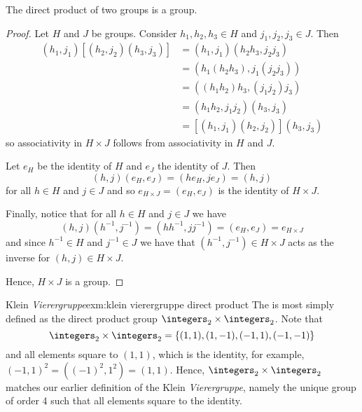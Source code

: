 \begin{thm}{}{}
    The direct product of two groups is a group.
    
    \begin{proof}
        Let \(H\) and \(J\) be groups.
        Consider \(h_1, h_2, h_3 \in H\) and \(j_1, j_2, j_3 \in J\).
        Then
        \begin{align}
            (h_1, j_1)[(h_2, j_2)(h_3, j_3)] &= (h_1, j_1)(h_2h_3, j_2j_3)\\
            &= (h_1(h_2h_3), j_1(j_2j_3))\\
            &= ((h_1h_2)h_3, (j_1j_2)j_3)\\
            &= (h_1h_2, j_1j_2)(h_3, j_3)\\
            &= [(h_1, j_1)(h_2, j_2)](h_3, j_3)
        \end{align}
        so associativity in \(H\times J\) follows from associativity in \(H\) and \(J\).
        
        Let \(e_H\) be the identity of \(H\) and \(e_J\) the identity of \(J\).
        Then
        \begin{equation}
            (h, j) (e_H, e_J) = (he_H, je_J) = (h, j)
        \end{equation}
        for all \(h \in H\) and \(j \in J\) and so \(e_{H\times J} = (e_H, e_J)\) is the identity of \(H \times J\).
        
        Finally, notice that for all \(h \in H\) and \(j \in J\) we have
        \begin{equation}
            (h, j)(h^{-1}, j^{-1}) = (hh^{-1}, jj^{-1}) = (e_H, e_J) = e_{H\times J}
        \end{equation}
        and since \(h^{-1} \in H\) and \(j^{-1} \in J\) we have that \((h^{-1}, j^{-1}) \in H\times J\) acts as the inverse for \((h, j) \in H \times J\).
        
        Hence, \(H \times J\) is a group.
    \end{proof}
\end{thm}

\begin{exm}{Klein \textit{Vierergruppe}}{exm:klein vierergruppe direct product}
    The  is most simply defined as the direct product group \(\integers_2 \times \integers_2\).
    Note that
    \begin{equation}
        \integers_2 \times \integers_2 = \{(1, 1), (1, -1), (-1, 1), (-1, -1)\}
    \end{equation}
    and all elements square to \((1, 1)\), which is the identity, for example, \((-1, 1)^2 = ((-1)^2, 1^2) = (1, 1)\).
    Hence, \(\integers_2 \times \integers_2\) matches our earlier definition of the Klein \textit{Vierergruppe}, namely the unique group of order 4 such that all elements square to the identity.
\end{exm}

